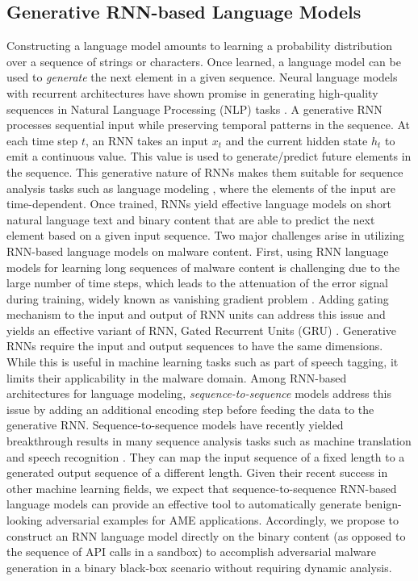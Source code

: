 \documentclass[letterpaper]{article}
\begin{document}
\subsection{Generative RNN-based Language Models}
\label{background_RNN}
Constructing a language model amounts to learning a probability distribution over a sequence of strings or characters. Once learned, a language model can be used to \textit{generate} the next element in a given sequence. Neural language models with recurrent architectures have shown promise in generating high-quality sequences in Natural Language Processing (NLP) tasks \cite{kim2016character}. A generative RNN processes sequential input while preserving temporal patterns in the sequence. At each time step $t$, an RNN takes an input $x_t$ and the current hidden state $h_t$ to emit a continuous value. This value is used to generate/predict future elements in the sequence. This generative nature of RNNs makes them suitable for sequence analysis tasks such as language modeling \cite{belletti2019quantifying}, where the elements of the input are time-dependent. Once trained, RNNs yield effective language models on short natural language text and binary content \cite{zuo2018neural} that are able to predict the next element based on a given input sequence.
Two major challenges arise in utilizing RNN-based language models on malware content. First, using RNN language models for learning long sequences of malware content is challenging \cite{raff2018malware} due to the large number of time steps, which leads to the attenuation of the error signal during training, widely known as vanishing gradient problem \cite{goldberg_neural_2017}. Adding gating mechanism to the input and output of RNN units can address this issue and yields an effective variant of RNN, Gated Recurrent Units (GRU) \cite{goldberg_neural_2017}.
Generative RNNs require the input and output sequences to have the same dimensions. While this is useful in machine learning tasks such as part of speech tagging, it limits their applicability in the malware domain. Among RNN-based architectures for language modeling, \emph{sequence-to-sequence} models address this issue by adding an additional encoding step before feeding the data to the generative RNN. Sequence-to-sequence models have recently yielded breakthrough results in many sequence analysis tasks such as machine translation \cite{ono-etal-2019-hybrid} and speech recognition \cite{irie2019choice}. They can map the input sequence of a fixed length to a generated output sequence of a different length. Given their recent success in other machine learning fields, we expect that sequence-to-sequence RNN-based language models can provide an effective tool to automatically generate benign-looking adversarial examples for AME applications. Accordingly, we propose to construct an RNN language model directly on the binary content (as opposed to the sequence of API calls in a sandbox) to accomplish adversarial malware generation in a binary black-box scenario without requiring dynamic analysis.    
    
\end{document}
